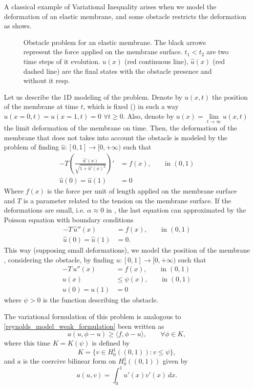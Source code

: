 A classical example of Variational Inequality arises when we model the deformation of an elastic membrane, and some obstacle restricts the deformation as  shows.
\begin{figure}[h!]
\centering 
\def\svgwidth{\textwidth}	
\footnotesize{
\caption[Obstacle problem for an elastic membrane.]{Obstacle problem for an elastic membrane. The black arrows represent the force applied on the membrane surface. $t_1<t_2$ are two time steps of it evolution. $u(x)$ (red continuous line), $\hat{u}(x)$ (red dashed line) are the final states with the obstacle presence and without it resp.}\label{fig:obstacle_problem}}
\end{figure}
Let us describe the 1D modeling of the problem. Denote by $u(x,t)$ the position of the membrane at time $t$, which is fixed () in such a way $u(x=0,t)=u(x=1,t)=0$ $\forall t\geq 0$. Also, denote by $u(x)=\underset{t\rightarrow \infty}{\lim}u(x,t)$ the limit deformation of the membrane on time. Then, the deformation of the membrane that does not takes into account the obstacle is modeled by the problem of finding $\hat{u}:[0,1]\rightarrow [0,+\infty)$ such that
\begin{align*}
-T\left( \frac{\hat{u}'(x)}{\sqrt{1+\hat{u}'(x)^2}} \right)'&=f(x),\qquad\text{in } (0,1)\\
\hat{u}(0)=\hat{u}(1)&=0
\end{align*}
Where $f(x)$ is the force per unit of length applied on the membrane surface and $T$ is a parameter related to the tension on the membrane surface. If the deformations are small, i.e. $\alpha\approx 0$ in , the last equation can approximated by the Poisson equation with boundary conditions
\begin{align*}
-T\,\hat{u}''(x)&=f(x),\qquad\text{in } (0,1)\\
\hat{u}(0)=\hat{u}(1)&=0.
\end{align*}
This way (supposing small deformations), we model the position of the membrane , considering the obstacle, by finding $u:[0,1]\rightarrow [0,+\infty)$ such that
\begin{align*}
-T\,u''(x)&=f(x),\qquad\text{in } (0,1)\\
u(x)&\leq \psi(x),\qquad\text{in } (0,1)\\
u(0)=u(1)&=0
\end{align*}
where $\psi>0$ is the function describing the obstacle.

The variational formulation of this problem is analogous to \eqref{reynolds_model_weak_formulation} been written as
\begin{equation}
a(u,\phi-u)\geq\langle f,\phi-u\rangle,\qquad\forall \phi \in K,
\end{equation}
where this time $K=K(\psi)$ is defined by $$K=\{v\in H_0^1\left((0,1)\right):v\leq \psi \},$$
and $a$ is the coercive bilinear form on $H_0^1\left((0,1)\right)$ given by
$$a(u,v)=\int_0^1 u'(x)v'(x)\,dx.$$
